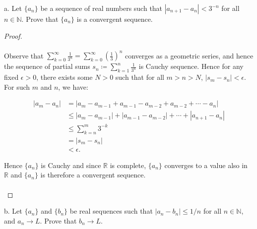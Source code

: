 a.  Let $\{a_n\}$ be a sequence of real numbers such that 
    $|a_{n+1} - a_n| < 3^{-n}$ for all $n \in \mathbb{N}$. Prove that $\{a_n\}$
    is a convergent sequence.  \\

    \begin{proof}\ \\\\
        Observe that $\sum\limits_{k=0}^{\infty}{\frac{1}{3^{n}}} = \sum\limits_{k=0}^{\infty}{\left(\frac{1}{3}\right)^n}$
        converges as a geometric series, and hence the sequence of partial sums 
        $s_n \coloneqq \sum\limits_{k=1}^{n}{\frac{1}{3^{n}}}$ is Cauchy
        sequence.  Hence for any fixed $\epsilon > 0$, there exists some $N > 0$
        such that for all $m > n > N$, $|s_m - s_n| < \epsilon$. For such $m$ 
        and $n$, we have:
    
        \begin{align*}
            |a_m - a_n| &= |a_m - a_{m-1} + a_{m-1} - a_{m-2} + a_{m-2} + \cdots - a_n | \\
                        &\le |a_m - a_{m-1}| + |a_{m-1} - a_{m-2}| + \cdots + |a_{n+1} - a_n | \\
                        &\le \sum\limits_{k=n}^m{3^{-k}} \\ 
                        &= |s_m - s_n| \\
                        &< \epsilon.
        \end{align*}
    
        Hence $\{a_n\}$ is Cauchy and since $\mathbb{R}$ is complete, $\{a_n\}$
        converges to a value also in $\mathbb{R}$ and $\{a_n\}$ is therefore a
        convergent sequence.
        \\\\
    \end{proof}
    \pagebreak

b.  Let $\{a_n\}$ and $\{b_n\}$ be real sequences such that
    $|a_n - b_n| \le 1/n$ for all $n \in \mathbb{N}$, and $a_n \rightarrow L$.
    Prove that $b_n \rightarrow L$. \\

